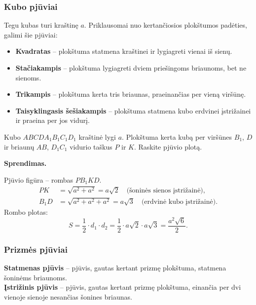 \subsubsection{Kubo pjūviai}

Tegu kubas turi kraštinę $a$. Priklausomai nuo kertančiosios plokštumos padėties, galimi šie pjūviai:

\begin{itemize}
    \item \textbf{Kvadratas} – plokštuma statmena kraštinei ir lygiagreti vienai iš sienų.
    \item \textbf{Stačiakampis} – plokštuma lygiagreti dviem priešingoms briaunoms, bet ne sienoms.
    \item \textbf{Trikampis} – plokštuma kerta tris briaunas, praeinančias per vieną viršūnę.
    \item \textbf{Taisyklingasis šešiakampis} – plokštuma statmena kubo erdvinei įstrižainei ir praeina per jos vidurį.
\end{itemize}

\begin{example}
Kubo $ABCDA_1B_1C_1D_1$ kraštinė lygi $a$. Plokštuma kerta kubą per viršūnes $B_1$, $D$ ir briaunų $AB$, $D_1C_1$ vidurio taškus $P$ ir $K$. Raskite pjūvio plotą.

\textbf{Sprendimas.}

Pjūvio figūra – rombas $PB_1KD$.
\begin{align*}
PK &= \sqrt{a^2 + a^2} = a\sqrt{2} \quad \text{(šoninės sienos įstrižainė)},\\
B_1D &= \sqrt{a^2 + a^2 + a^2} = a\sqrt{3} \quad \text{(erdvinė kubo įstrižainė)}.
\end{align*}
Rombo plotas:
\[
S = \frac{1}{2} \cdot d_1 \cdot d_2 = \frac{1}{2} \cdot a\sqrt{2} \cdot a\sqrt{3} = \frac{a^2\sqrt{6}}{2}.
\]
\end{example}

\subsubsection{Prizmės pjūviai}

\begin{definition}
\textbf{Statmenas pjūvis} – pjūvis, gautas kertant prizmę plokštuma, statmena šoninėms briaunoms.\\
\textbf{Įstrižinis pjūvis} – pjūvis, gautas kertant prizmę plokštuma, einančia per dvi vienoje sienoje nesančias šonines briaunas.
\end{definition}

